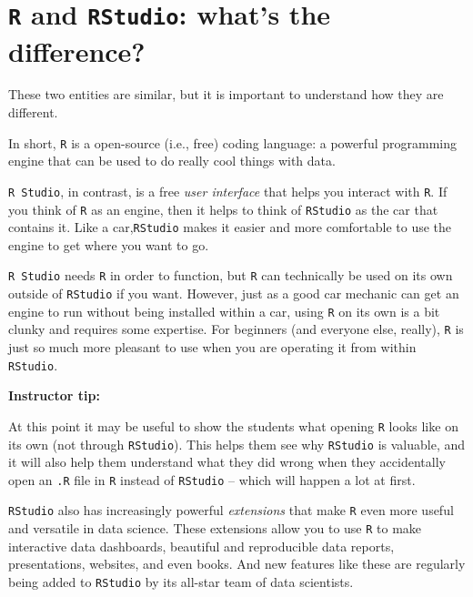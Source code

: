 \documentclass[
]{book}
\begin{document}
\hypertarget{r-and-rstudio-whats-the-difference}{%
\section*{\texorpdfstring{\texttt{R} and \texttt{RStudio}: what's the difference?}{R and RStudio: what's the difference?}}\label{r-and-rstudio-whats-the-difference}}

These two entities are similar, but it is important to understand how they are different.

In short, \texttt{R} is a open-source (i.e., free) coding language: a powerful programming engine that can be used to do really cool things with data.

\texttt{R\ Studio}, in contrast, is a free \emph{user interface} that helps you interact with \texttt{R}. If you think of \texttt{R} as an engine, then it helps to think of \texttt{RStudio} as the car that contains it. Like a car,\texttt{RStudio} makes it easier and more comfortable to use the engine to get where you want to go.

\texttt{R\ Studio} needs \texttt{R} in order to function, but \texttt{R} can technically be used on its own outside of \texttt{RStudio} if you want. However, just as a good car mechanic can get an engine to run without being installed within a car, using \texttt{R} on its own is a bit clunky and requires some expertise. For beginners (and everyone else, really), \texttt{R} is just so much more pleasant to use when you are operating it from within \texttt{RStudio}.

\leavevmode\hypertarget{tip-text}{}%
\textbf{Instructor tip:}

At this point it may be useful to show the students what opening \texttt{R} looks like on its own (not through \texttt{RStudio}). This helps them see why \texttt{RStudio} is valuable, and it will also help them understand what they did wrong when they accidentally open an \texttt{.R} file in \texttt{R} instead of \texttt{RStudio} -- which will happen a lot at first.

\texttt{RStudio} also has increasingly powerful \emph{extensions} that make \texttt{R} even more useful and versatile in data science. These extensions allow you to use \texttt{R} to make interactive data dashboards, beautiful and reproducible data reports, presentations, websites, and even books. And new features like these are regularly being added to \texttt{RStudio} by its all-star team of data scientists.
\end{document}
